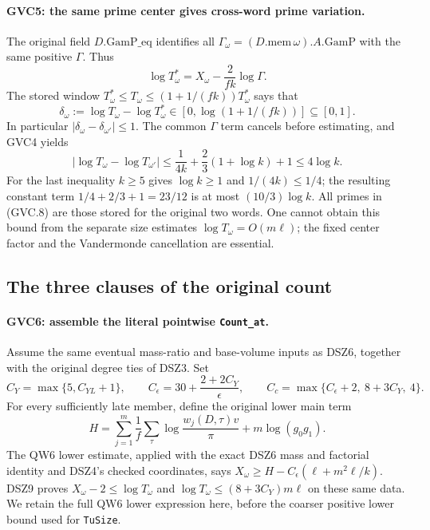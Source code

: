 \paragraph{GVC5: the same prime center gives cross-word prime variation.}
\label{claim:GVC5}
The original field $D.\mathrm{GamP\_eq}$ identifies all
$\Gamma_\omega=(D.\mathrm{mem}\,\omega).A.\mathrm{GamP}$
with the same positive $\Gamma$. Thus
\[
 \log T_\omega^*
       =X_\omega-\frac2{fk}\log\Gamma .
\]
The stored window $T_\omega^*\le T_\omega
\le(1+1/(fk))T_\omega^*$ says that
\[
 \delta_\omega:=\log T_\omega-\log T_\omega^*
          \in[0,\log(1+1/(fk))]\subseteq[0,1].
\]
In particular $|\delta_\omega-\delta_{\omega'}|\le1$.
The common $\Gamma$ term cancels before estimating, and GVC4 yields
\[
 |\log T_\omega-\log T_{\omega'}|
 \le\frac1{4k}+\frac23(1+\log k)+1
 \le4\log k.                                                 \tag{GVC.8}
\]
For the last inequality $k\ge5$ gives $\log k\ge1$ and
$1/(4k)\le1/4$; the resulting constant term
$1/4+2/3+1=23/12$ is at most $(10/3)\log k$.
All primes in (GVC.8) are those stored for the original two words.
One cannot obtain this bound from the separate size estimates
$\log T_\omega=O(m\ell)$; the fixed center factor and the
Vandermonde cancellation are essential.

\subsection{The three clauses of the original count}

\paragraph{GVC6: assemble the literal pointwise \texttt{Count\_at}.}
\label{claim:GVC6}
Assume the same eventual mass-ratio and base-volume inputs as
DSZ6, together with the original degree ties of DSZ3.
Set
\[
 C_Y=\max\{5,C_{YL}+1\},\qquad
 C_\epsilon=30+\frac{2+2C_Y}{\epsilon},\qquad
 C_c=\max\{C_\epsilon+2,\ 8+3C_Y,\ 4\}.                      \tag{GVC.9}
\]
For every sufficiently late member, define the original lower main
term
\[
 H=\sum_{j=1}^{m}\frac1f\sum_\tau
       \log\frac{w_j(D,\tau)v}{\pi}
       +m\log(g_0g_1).
\]
The QW6 lower estimate, applied with the exact DSZ6 mass and
factorial identity and DSZ4's checked coordinates, says
$X_\omega\ge H-C_\epsilon(\ell+m^2\ell/k)$.
DSZ9 proves $X_\omega-2\le\log T_\omega$ and
$\log T_\omega\le(8+3C_Y)m\ell$ on these same data.
We retain the full QW6 lower expression here, before the
coarser positive lower bound used for \texttt{TuSize}.

